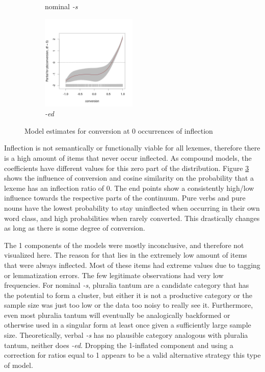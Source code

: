 \documentclass[
]{article}
\begin{document}
\begin{figure}[t!]
\begin{subfigure}[b]{0.49\textwidth}
         \caption{nominal \textit{-s}}
         \label{noun_nu_conv}
     \end{subfigure}
     \begin{subfigure}[b]{\textwidth}
         \centering
         \includegraphics[width=0.5\textwidth]{figures/m_ed_nu_conversion.jpg}
         \caption{\textit{-ed}}
         \label{ed_nu_conv}
     \end{subfigure}
        \caption{Model estimates for conversion at 0 occurrences of inflection}
        \label{zero}
\end{figure}

Inflection is not semantically or functionally viable for all lexemes,
therefore there is a high amount of items that never occur inflected. As
compound models, the coefficients have different values for this zero
part of the distribution. Figure \ref{zero} shows the influence of
conversion and cosine similarity on the probability that a lexeme has an
inflection ratio of 0. The end points show a consistently high/low
influence towards the respective parts of the continuum. Pure verbs and
pure nouns have the lowest probability to stay uninflected when
occurring in their own word class, and high probabilities when rarely
converted. This drastically changes as long as there is some degree of
conversion.

The 1 components of the models were mostly inconclusive, and therefore
not visualized here. The reason for that lies in the extremely low
amount of items that were always inflected. Most of these items had
extreme values due to tagging or lemmatization errors. The few
legitimate observations had very low frequencies. For nominal \emph{-s},
pluralia tantum are a candidate category that has the potential to form
a cluster, but either it is not a productive category or the sample size
was just too low or the data too noisy to really see it. Furthermore,
even most pluralia tantum will eventually be analogically backformed or
otherwise used in a singular form at least once given a sufficiently
large sample size. Theoretically, verbal \emph{-s} has no plausible
category analogous with pluralia tantum, neither does \emph{-ed}.
Dropping the 1-inflated component and using a correction for ratios
equal to 1 appears to be a valid alternative strategy this type of
model.
\end{document}
